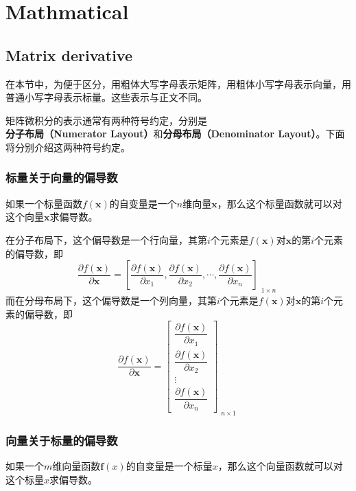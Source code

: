 \appendix
\chapter{Mathmatical}

\section{Matrix derivative}
\label{sec:matrix_derivative}

\begin{wenxintishi}
	在本节中，为便于区分，用粗体大写字母表示矩阵，用粗体小写字母表示向量，用普通小写字母表示标量。这些表示与正文不同。
\end{wenxintishi}

矩阵微积分的表示通常有两种符号约定，分别是\textbf{分子布局（Numerator Layout）}和\textbf{分母布局（Denominator Layout）}\cite{matrix_cookbook}。下面将分别介绍这两种符号约定。

\subsection{标量关于向量的偏导数}
如果一个标量函数$f(\bm{x})$的自变量是一个$n$维向量$\bm{x}$，那么这个标量函数就可以对这个向量$\bm{x}$求偏导数。

在分子布局下，这个偏导数是一个行向量，其第$i$个元素是$f(\bm{x})$对$\bm{x}$的第$i$个元素的偏导数，即
\begin{equation}
	\frac{\partial f(\bm{x})}{\partial \bm{x}}
	=\left[\frac{\partial f(\bm{x})}{\partial x_1},\frac{\partial f(\bm{x})}{\partial x_2},\cdots,\frac{\partial f(\bm{x})}{\partial x_n}\right]_{\substack{\scriptstyle 1\times n}}
\end{equation}
而在分母布局下，这个偏导数是一个列向量，其第$i$个元素是$f(\bm{x})$对$\bm{x}$的第$i$个元素的偏导数，即
\begin{equation}
	\frac{\partial f(\bm{x})}{\partial \bm{x}}
	=\begin{bmatrix}
		\dfrac{\partial f(\bm{x})}{\partial x_1}\\[2ex]
		\dfrac{\partial f(\bm{x})}{\partial x_2}\\[2ex]
		\vdots\\[2ex]
		\dfrac{\partial f(\bm{x})}{\partial x_n}
	\end{bmatrix}_{\substack{\scriptstyle n\times 1}}
\end{equation}

\subsection{向量关于标量的偏导数}
如果一个$m$维向量函数$\bm{f}(x)$的自变量是一个标量$x$，那么这个向量函数就可以对这个标量$x$求偏导数。


